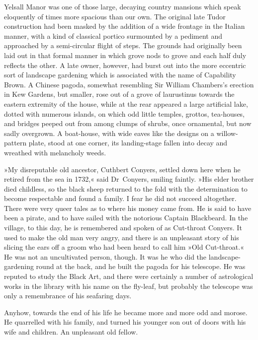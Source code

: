 Yelsall Manor was one of those large, decaying country mansions which speak eloquently of times more spacious than our own. The original late Tudor construction had been masked by the addition of a wide frontage in the Italian manner, with a kind of classical portico surmounted by a pediment and approached by a semi-circular flight of steps. The grounds had originally been laid out in that formal manner in which grove nods to grove and each half duly reflects the other. A late owner, however, had burst out into the more eccentric sort of landscape gardening which is associated with the name of Capability Brown. A Chinese pagoda, somewhat resembling Sir William Chambers's erection in Kew Gardens, but smaller, rose out of a grove of laurustinus towards the eastern extremity of the house, while at the rear appeared a large artificial lake, dotted with numerous islands, on which odd little temples, grottos, tea-houses, and bridges peeped out from among clumps of shrubs, once ornamental, but now sadly overgrown. A boat-house, with wide eaves like the designs on a willow-pattern plate, stood at one corner, its landing-stage fallen into decay and wreathed with melancholy weeds.

»My disreputable old ancestor, Cuthbert Conyers, settled down here when he retired from the sea in 1732,« said Dr~Conyers, smiling faintly. »His elder brother died childless, so the black sheep returned to the fold with the determination to become respectable and found a family. I fear he did not succeed altogether. There were very queer tales as to where his money came from. He is said to have been a pirate, and to have sailed with the notorious Captain Blackbeard. In the village, to this day, he is remembered and spoken of as Cut-throat Conyers. It used to make the old man very angry, and there is an unpleasant story of his slicing the ears off a groom who had been heard to call him »Old Cut-throat.« He was not an uncultivated person, though. It was he who did the landscape-gardening round at the back, and he built the pagoda for his telescope. He was reputed to study the Black Art, and there were certainly a number of astrological works in the library with his name on the fly-leaf, but probably the telescope was only a remembrance of his seafaring days.

Anyhow, towards the end of his life he became more and more odd and morose. He quarrelled with his family, and turned his younger son out of doors with his wife and children. An unpleasant old fellow.

